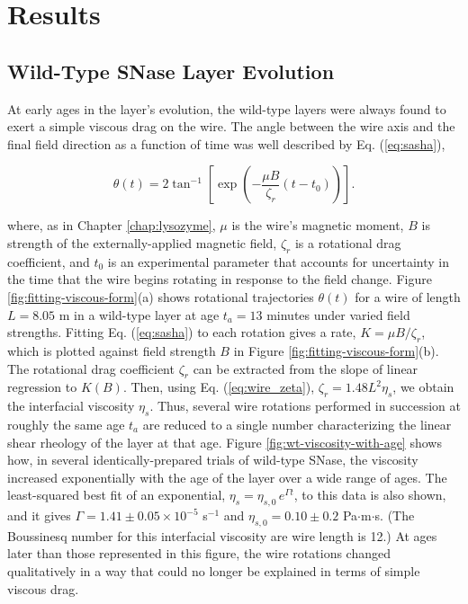\section{Results}
\subsection{Wild-Type SNase Layer Evolution}

At early ages in the layer's evolution, the wild-type layers were always found to exert a simple viscous drag on the wire. The angle between the wire axis and the final field direction as a function of time was well described by Eq. (\ref{eq:sasha}),

\begin{equation*}
 \theta(t) = 2 \tan^{-1} \left[ \exp \left( -\frac{\mu B}{\zeta_r} (t-t_0) \right) \right].
\end{equation*}

\noindent where, as in Chapter \ref{chap:lysozyme}, $\mu$ is the wire's magnetic moment, $B$ is strength of the externally-applied magnetic field, $\zeta_r$ is a rotational drag coefficient, and $t_0$ is an experimental parameter that accounts for uncertainty in the time that the wire begins rotating in response to the field change. Figure \ref{fig:fitting-viscous-form}(a) shows rotational trajectories $\theta(t)$ for a wire of length $L=8.05$ \textmu m in a wild-type layer at age $t_a=13$ minutes under varied field strengths. Fitting Eq. (\ref{eq:sasha}) to each rotation gives a rate, $K=\mu B/\zeta_r$, which is plotted against field strength $B$ in Figure \ref{fig:fitting-viscous-form}(b). The rotational drag coefficient $\zeta_r$ can be extracted from the slope of linear regression to $K(B)$. Then, using Eq. (\ref{eq:wire_zeta}), $\zeta_r = 1.48 L^2\eta_s$, we obtain the interfacial viscosity $\eta_s$. Thus, several wire rotations performed in succession at roughly the same age $t_a$ are reduced to a single number characterizing the linear shear rheology of the layer at that age. Figure \ref{fig:wt-viscosity-with-age} shows how, in several identically-prepared trials of wild-type SNase, the viscosity increased exponentially with the age of the layer over a wide range of ages. The least-squared best fit of an exponential, $\eta_s=\eta_{s,0}\, e^{\Gamma t}$, to this data is also shown, and it gives $\Gamma=1.41 \pm 0.05 \times 10^{-5}$ s$^{-1}$ and $\eta_{s,0}=0.10 \pm 0.2$ \textmu Pa$\cdot$m$\cdot$s. (The Boussinesq number for this interfacial viscosity are wire length is 12.) At ages later than those represented in this figure, the wire rotations changed qualitatively in a way that could no longer be explained in terms of simple viscous drag.


